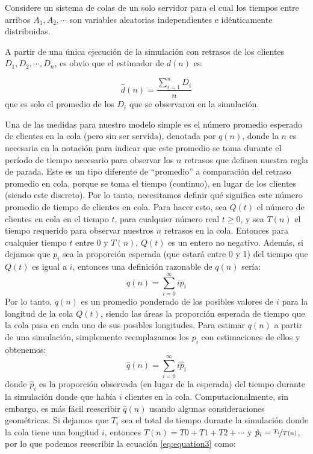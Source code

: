 Considere un sistema de colas de un solo servidor para el cual los tiempos entre arribos $A_{1}, A_{2}, \cdots$ son variables aleatorias independientes e idénticamente distribuidas.

A partir de una única ejecución de la simulación con retrasos de los clientes $D_{1}, D_{2}, \cdots, D_{n}$, es obvio que el
estimador de $d(n)$ es:

\begin{equation} \label{eq:equation}
\hat{d}(n) = \frac{\sum_{i = 1}^{n}D_{i}}{n}
\end{equation}
que es solo el promedio de los $D_{i}$ que se observaron en la simulación.

Una de las medidas para nuestro modelo simple es el número promedio esperado de clientes en la cola (pero sin
ser servida), denotada por $q(n)$, donde la $n$ es necesaria en la notación para indicar que este promedio se
toma durante el período de tiempo necesario para observar los $n$ retrasos que definen
nuestra regla de parada.
Este es un tipo diferente de ``promedio'' a comparación del retraso promedio en cola, porque se toma el tiempo
(continuo), en lugar de los clientes (siendo este discreto).
Por lo tanto, necesitamos definir qué significa este número promedio de tiempo de
clientes en cola.
Para hacer esto, sea $Q(t)$ el número de clientes en cola en el tiempo $t$, para cualquier número real $t \geq 0$,
y sea $T(n)$ el tiempo requerido para observar nuestros $n$ retrasos en la cola.
Entonces para cualquier tiempo $t$ entre $0$ y $T(n)$, $Q(t)$ es un entero no negativo. Además, si dejamos que $p_{i}$ sea la
proporción esperada (que estará entre 0 y 1) del tiempo que $Q(t)$ es igual a $i$, entonces una definición
razonable de $q(n)$ sería:
 \begin{equation}
   \label{eq:equation2}
q(n) = \sum_{i=0}^{\infty}ip_{i}
 \end{equation}
Por lo tanto, $q(n)$ es un promedio ponderado de los posibles valores de $i$ para la longitud de la cola $Q(t)$,
siendo las áreas la proporción esperada de tiempo que la cola pasa en cada uno de sus posibles longitudes.
Para estimar $q(n)$ a partir de una simulación, simplemente reemplazamos los $p_{i}$ con estimaciones de ellos y
obtenemos:
\begin{equation}
  \label{eq:equation3}
  \hat{q}(n) = \sum_{i=0}^{\infty}i\hat{p}_{i}
\end{equation}
donde $\hat{p}_{i}$ es la proporción observada (en lugar de la esperada) del tiempo durante la simulación
donde que había $i$ clientes en la cola.
Computacionalmente, sin embargo, es más fácil reescribir $\hat{q}(n)$ usando algunas consideraciones geométricas.
Si dejamos que $T_{i}$ sea el total de tiempo durante la simulación donde la cola tiene una longitud $i$, entonces
$T(n) = T0 + T1 + T2 + \cdots$ y $\hat{p}_{i} = \nicefrac{T_{i}}{T(n)}$, por lo que podemos reescribir la ecuación \ref{eq:equation3} como:


